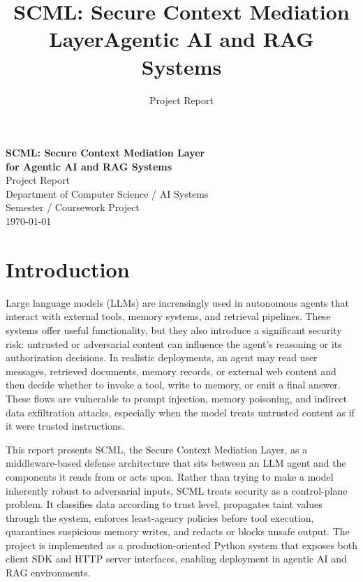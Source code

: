 \documentclass[12pt]{article}
\title{SCML: Secure Context Mediation Layer\for Agentic AI and RAG Systems}
\author{Project Report}
\date{}
\begin{document}
\begin{titlepage}
    \centering
    \vspace*{2cm}
    {\fontsize{20}{24}\selectfont \textbf{SCML: Secure Context Mediation Layer}}\\[0.6cm]
    {\fontsize{18}{22}\selectfont \textbf{for Agentic AI and RAG Systems}}\\[2cm]

    {\fontsize{14}{18}\selectfont Project Report}\\[3cm]

    {\fontsize{12}{16}\selectfont Department of Computer Science / AI Systems}\\[0.4cm]
    {\fontsize{12}{16}\selectfont Semester / Coursework Project}\\[0.4cm]
    {\fontsize{12}{16}\selectfont \today}\\[2cm]

    \vfill
\end{titlepage}

\tableofcontents
\clearpage

\section{Introduction}

Large language models (LLMs) are increasingly used in autonomous agents that interact with external tools, memory systems, and retrieval pipelines. These systems offer useful functionality, but they also introduce a significant security risk: untrusted or adversarial content can influence the agent's reasoning or its authorization decisions. In realistic deployments, an agent may read user messages, retrieved documents, memory records, or external web content and then decide whether to invoke a tool, write to memory, or emit a final answer. These flows are vulnerable to prompt injection, memory poisoning, and indirect data exfiltration attacks, especially when the model treats untrusted content as if it were trusted instructions.

This report presents SCML, the Secure Context Mediation Layer, as a middleware-based defense architecture that sits between an LLM agent and the components it reads from or acts upon. Rather than trying to make a model inherently robust to adversarial inputs, SCML treats security as a control-plane problem. It classifies data according to trust level, propagates taint values through the system, enforces least-agency policies before tool execution, quarantines suspicious memory writes, and redacts or blocks unsafe output. The project is implemented as a production-oriented Python system that exposes both client SDK and HTTP server interfaces, enabling deployment in agentic AI and RAG environments.
\end{document}
